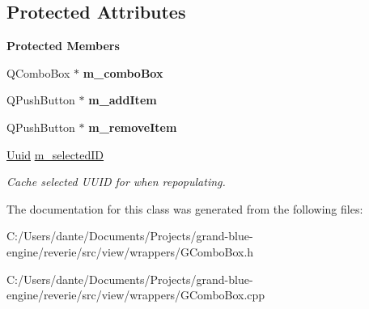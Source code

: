\subsection*{Protected Attributes}
\begin{Indent}\textbf{ Protected Members}\par
\begin{DoxyCompactItemize}
\item 
\mbox{\label{classrev_1_1_view_1_1_editable_combo_box_ab39d29e7649bbfa1d7eb098dd2af6cc2}} 
Q\+Combo\+Box $\ast$ {\bfseries m\+\_\+combo\+Box}
\item 
\mbox{\label{classrev_1_1_view_1_1_editable_combo_box_a529e310b62daf5158da5b6405a2a1034}} 
Q\+Push\+Button $\ast$ {\bfseries m\+\_\+add\+Item}
\item 
\mbox{\label{classrev_1_1_view_1_1_editable_combo_box_a38dc8a12762ce806eafda9825dd126ab}} 
Q\+Push\+Button $\ast$ {\bfseries m\+\_\+remove\+Item}
\item 
\mbox{\label{classrev_1_1_view_1_1_editable_combo_box_aad24ad21c32a3fe9daae86c1dcb873ec}} 
\mbox{\hyperlink{classrev_1_1_uuid}{Uuid}} \mbox{\hyperlink{classrev_1_1_view_1_1_editable_combo_box_aad24ad21c32a3fe9daae86c1dcb873ec}{m\+\_\+selected\+ID}}
\begin{DoxyCompactList}\small\item\em Cache selected U\+U\+ID for when repopulating. \end{DoxyCompactList}\end{DoxyCompactItemize}
\end{Indent}


The documentation for this class was generated from the following files\+:\begin{DoxyCompactItemize}
\item 
C\+:/\+Users/dante/\+Documents/\+Projects/grand-\/blue-\/engine/reverie/src/view/wrappers/G\+Combo\+Box.\+h\item 
C\+:/\+Users/dante/\+Documents/\+Projects/grand-\/blue-\/engine/reverie/src/view/wrappers/G\+Combo\+Box.\+cpp\end{DoxyCompactItemize}
